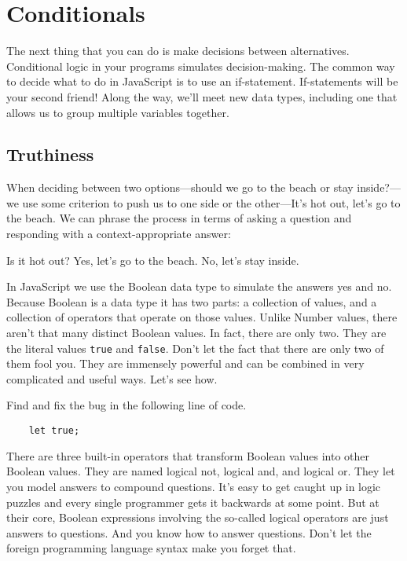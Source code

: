 \chapter[Second Friend: Conditionals]{Conditionals}

The next thing that you can do is make decisions between alternatives. Conditional logic in your programs simulates decision-making. The common way to decide what to do in JavaScript is to use an if-statement. If-statements will be your second friend! Along the way, we'll meet new data types, including one that allows us to group multiple variables together.

\section{Truthiness}
When deciding between two options---should we go to the beach or stay inside?---we use some criterion to push us to one side or the other---It's hot out, let's go to the beach. We can phrase the process in terms of asking a question and responding with a context-appropriate answer:

Is it hot out?
Yes, let's go to the beach.
No, let's stay inside.

In JavaScript we use the \textsf{Boolean} data type to simulate the answers yes and no. Because \textsf{Boolean} is a data type it has two parts: a collection of values, and a collection of operators that operate on those values. Unlike \textsf{Number} values, there aren't that many distinct \textsf{Boolean} values. In fact, there are only two. They are the literal values \texttt{true} and \texttt{false}. Don't let the fact that there are only two of them fool you. They are immensely powerful and can be combined in very complicated and useful ways. Let's see how.

\begin{question}
  Find and fix the bug in the following line of code.
  \begin{lstlisting}
    let true;
  \end{lstlisting}
\end{question}

There are three built-in operators that transform \textsf{Boolean} values into other \textsf{Boolean} values. They are named logical \textsf{not}, logical \textsf{and}, and logical \textsf{or}. They let you model answers to compound questions. It's easy to get caught up in logic puzzles and every single programmer gets it backwards at some point. But at their core, \textsf{Boolean} expressions involving the so-called logical operators are just answers to questions. And you know how to answer questions. Don't let the foreign programming language syntax make you forget that.

